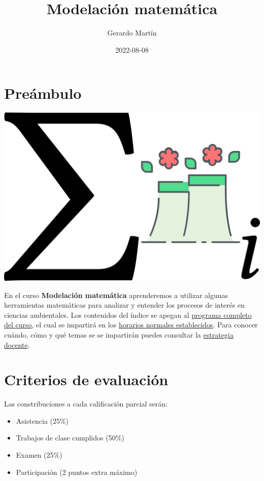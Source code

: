 \documentclass[
]{book}
\title{Modelación matemática}
\author{Gerardo Martín}
\date{2022-08-08}
\providecommand{\tightlist}{%
  \setlength{\itemsep}{0pt}\setlength{\parskip}{0pt}}
\begin{document}
\maketitle

{
\setcounter{tocdepth}{1}
\tableofcontents
}
\hypertarget{preuxe1mbulo}{%
\chapter{Preámbulo}\label{preuxe1mbulo}}

\begin{center}\includegraphics{logo} \end{center}

En el curso \textbf{Modelación matemática} aprenderemos a utilizar algunas herramientas matemáticas para analizar y entender los procesos de interés en ciencias ambientales. Los contenidos del índice se apegan al \href{Programa-curso.pdf}{programa completo del curso}, el cual se impartirá en los \href{Horario.pdf}{horarios normales establecidos}. Para conocer cuándo, cómo y qué temas se se impartirán puedes consultar la \href{Estrategia-docente.pdf}{estrategia docente}.

\hypertarget{criterios-de-evaluaciuxf3n}{%
\chapter{Criterios de evaluación}\label{criterios-de-evaluaciuxf3n}}

Las constribuciones a cada calificación parcial serán:

\begin{itemize}
\tightlist
\item
  Asistencia (25\%)
\item
  Trabajos de clase cumplidos (50\%)
\item
  Examen (25\%)
\item
  Participación (2 puntos extra máximo)
\end{itemize}
\end{document}
